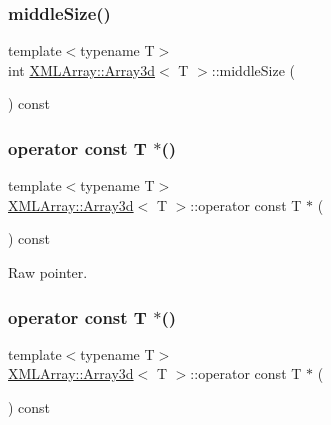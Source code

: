 \subsubsection{\texorpdfstring{middleSize()}{middleSize()}\hspace{0.1cm}{\footnotesize\ttfamily [3/3]}}
{\footnotesize\ttfamily template$<$typename T$>$ \\
int \mbox{\hyperlink{classXMLArray_1_1Array3d}{X\+M\+L\+Array\+::\+Array3d}}$<$ T $>$\+::middle\+Size (\begin{DoxyParamCaption}{ }\end{DoxyParamCaption}) const\hspace{0.3cm}{\ttfamily [inline]}}

\mbox{\label{classXMLArray_1_1Array3d_a8eb9d716a0efb8d1ac737fcbef8dd50c}} 
\subsubsection{\texorpdfstring{operator const T $\ast$()}{operator const T *()}\hspace{0.1cm}{\footnotesize\ttfamily [1/3]}}
{\footnotesize\ttfamily template$<$typename T$>$ \\
\mbox{\hyperlink{classXMLArray_1_1Array3d}{X\+M\+L\+Array\+::\+Array3d}}$<$ T $>$\+::operator const T $\ast$ (\begin{DoxyParamCaption}{ }\end{DoxyParamCaption}) const\hspace{0.3cm}{\ttfamily [inline]}}



Raw pointer. 

\mbox{\label{classXMLArray_1_1Array3d_a8eb9d716a0efb8d1ac737fcbef8dd50c}} 
\subsubsection{\texorpdfstring{operator const T $\ast$()}{operator const T *()}\hspace{0.1cm}{\footnotesize\ttfamily [2/3]}}
{\footnotesize\ttfamily template$<$typename T$>$ \\
\mbox{\hyperlink{classXMLArray_1_1Array3d}{X\+M\+L\+Array\+::\+Array3d}}$<$ T $>$\+::operator const T $\ast$ (\begin{DoxyParamCaption}{ }\end{DoxyParamCaption}) const\hspace{0.3cm}{\ttfamily [inline]}}



